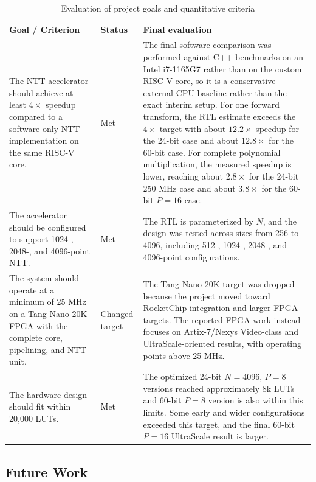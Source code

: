\documentclass[a4paper, 12pt, titlepage]{article}
\begin{document}
\begin{table}[H]
\centering
\scriptsize
\setlength{\tabcolsep}{3pt}
\renewcommand{\arraystretch}{1.05}
\caption{Evaluation of project goals and quantitative criteria}
\label{tab:goals-evaluation-criteria}
\begin{tabularx}{\textwidth}{|>{\raggedright\arraybackslash}p{}|>{\centering\arraybackslash}p{}|>{\raggedright\arraybackslash}X|}
\hline
\textbf{Goal / Criterion} & \textbf{Status} & \textbf{Final evaluation} \\
\hline
The NTT accelerator should achieve at least \(4\times\) speedup compared to a software-only NTT implementation on the same RISC-V core. & Met & The final software comparison was performed against C++ benchmarks on an Intel i7-1165G7 rather than on the custom RISC-V core, so it is a conservative external CPU baseline rather than the exact interim setup. For one forward transform, the RTL estimate exceeds the \(4\times\) target with about \(12.2\times\) speedup for the 24-bit case and about \(12.8\times\) for the 60-bit case. For complete polynomial multiplication, the measured speedup is lower, reaching about \(2.8\times\) for the 24-bit 250 MHz case and about \(3.8\times\) for the 60-bit \(P=16\) case. \\
\hline
The accelerator should be configured to support 1024-, 2048-, and 4096-point NTT. & Met & The RTL is parameterized by \(N\), and the design was tested across sizes from 256 to 4096, including 512-, 1024-, 2048-, and 4096-point configurations. \\
\hline
The system should operate at a minimum of 25 MHz on a Tang Nano 20K FPGA with the complete core, pipelining, and NTT unit. & Changed target & The Tang Nano 20K target was dropped because the project moved toward RocketChip integration and larger FPGA targets. The reported FPGA work instead focuses on Artix-7/Nexys Video-class and UltraScale-oriented results, with operating points above 25 MHz. \\
\hline
The hardware design should fit within 20,000 LUTs. & Met & The optimized 24-bit \(N=4096\), \(P=8\) versions reached approximately 8k LUTs and 60-bit \(P=8\) version is also within this limits. Some early and wider configurations exceeded this target, and the final 60-bit \(P=16\) UltraScale result is larger. \\
\hline
\end{tabularx}
\end{table}

\subsection{Future Work}
\end{document}
